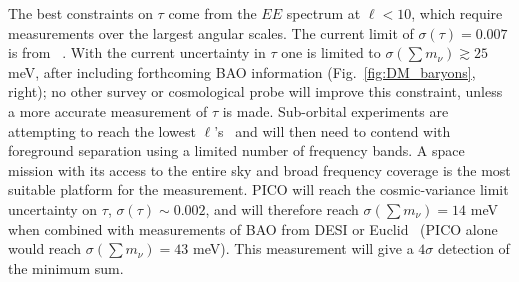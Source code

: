 \documentclass[PICOReport.tex]{subfiles}
\begin{document}
The best constraints on $\tau$ come from the $EE$ spectrum at $\ell < 10$, which require measurements over the largest angular scales. The current limit of $\sigma({\tau}) = 0.007$ is from \planck~\cite{planck2016_xlvi}.  
With the current uncertainty in $\tau$ one is limited to  $\sigma(\sum m_\nu) \gtrsim 25$ meV, after including forthcoming \ac{BAO} information (Fig.~\ref{fig:DM_baryons}, right); no other survey or cosmological probe will improve this constraint, unless a more accurate measurement of $\tau$ is made. Sub-orbital experiments are attempting to reach the lowest $\ell$'s~\citep{class} and will then need to contend with foreground separation using a limited number of frequency bands. A space mission with its access to the entire sky and broad frequency coverage is the most suitable platform for the measurement. PICO will reach the cosmic-variance limit uncertainty on $\tau$, $\sigma(\tau) \sim 0.002$, and will therefore reach $\sigma(\sum m_\nu) = 14$ meV when combined with measurements of \ac{BAO} from DESI or Euclid~\cite{Levi:2013gra} (PICO alone would reach $\sigma(\sum m_\nu) = 43$ meV).  This measurement will give a $4\sigma$ detection of the minimum sum.  

\end{document}
